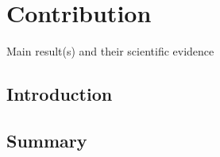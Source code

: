 \chapter{Contribution}

Main result(s) and their scientific evidence

\section{Introduction}

\section{Summary}
